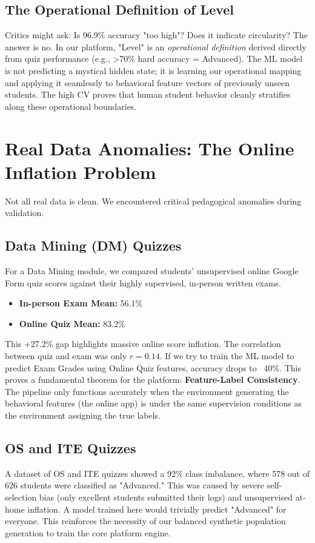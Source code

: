 \documentclass[11pt,a4paper]{article}
\begin{document}
\subsection{The Operational Definition of Level}
Critics might ask: Is 96.9\% accuracy "too high"? Does it indicate circularity? 
The answer is no. In our platform, "Level" is an \textit{operational definition} derived directly from quiz performance (e.g., >70\% hard accuracy = Advanced). The ML model is not predicting a mystical hidden state; it is learning our operational mapping and applying it seamlessly to behavioral feature vectors of previously unseen students. The high CV proves that human student behavior cleanly stratifies along these operational boundaries.

\section{Real Data Anomalies: The Online Inflation Problem}
Not all real data is clean. We encountered critical pedagogical anomalies during validation.

\subsection{Data Mining (DM) Quizzes}
For a Data Mining module, we compared students' unsupervised online Google Form quiz scores against their highly supervised, in-person written exams.
\begin{itemize}[label=\textcolor{primaryblue}{\textbullet}]
    \item \textbf{In-person Exam Mean:} 56.1\%
    \item \textbf{Online Quiz Mean:} 83.2\%
\end{itemize}
This +27.2\% gap highlights massive online score inflation. The correlation between quiz and exam was only $r = 0.14$. If we try to train the ML model to predict Exam Grades using Online Quiz features, accuracy drops to ~40\%. This proves a fundamental theorem for the platform: \textbf{Feature-Label Consistency}. The pipeline only functions accurately when the environment generating the behavioral features (the online app) is under the same supervision conditions as the environment assigning the true labels.

\subsection{OS and ITE Quizzes}
A dataset of OS and ITE quizzes showed a 92\% class imbalance, where 578 out of 626 students were classified as "Advanced." This was caused by severe self-selection bias (only excellent students submitted their logs) and unsupervised at-home inflation. A model trained here would trivially predict "Advanced" for everyone. This reinforces the necessity of our balanced synthetic population generation to train the core platform engine.
\end{document}
